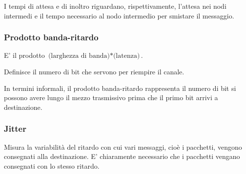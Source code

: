             I tempi di attesa e di inoltro riguardano, rispettivamente, l'attesa nei nodi intermedi e il tempo necessario al nodo intermedio per smistare il messaggio.
            
        \subsubsection{Prodotto banda-ritardo}
        
            E' il prodotto \(\text{(larghezza di banda)}*\text{(latenza)}\).
            
            Definisce il numero di bit che servono per riempire il canale.
            
            In termini informali, il prodotto banda-ritardo rappresenta il numero di bit si possono avere lungo il mezzo trasmissivo prima che il primo bit arrivi a destinazione.
            
        \subsubsection{Jitter}
        
            Misura la variabilità del ritardo con cui vari messaggi, cioè i pacchetti, vengono consegnati alla destinazione. E' chiaramente necessario che i pacchetti vengano consegnati con lo stesso ritardo.